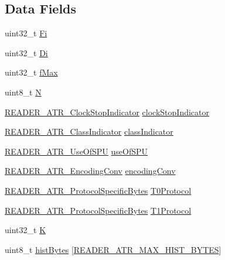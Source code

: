 \subsection*{Data Fields}
\begin{DoxyCompactItemize}
\item 
uint32\+\_\+t \hyperlink{struct_r_e_a_d_e_r___a_t_r___atr_a4b9462052eea4404479658f230fa1c44}{Fi}
\item 
uint32\+\_\+t \hyperlink{struct_r_e_a_d_e_r___a_t_r___atr_aaf651c30f03f8f1e13a9485bffce801e}{Di}
\item 
uint32\+\_\+t \hyperlink{struct_r_e_a_d_e_r___a_t_r___atr_aad51bc4d2b761f55851ccd39a180ba58}{f\+Max}
\item 
uint8\+\_\+t \hyperlink{struct_r_e_a_d_e_r___a_t_r___atr_a77200420e0e4a3db85d736b7a0b91f64}{N}
\item 
\hyperlink{reader__atr_8h_a88b93dcccf6f332cf9a8a08100706e7f}{R\+E\+A\+D\+E\+R\+\_\+\+A\+T\+R\+\_\+\+Clock\+Stop\+Indicator} \hyperlink{struct_r_e_a_d_e_r___a_t_r___atr_a6ff1a13065a4f65bf3d92b693f828547}{clock\+Stop\+Indicator}
\item 
\hyperlink{reader__atr_8h_a59d38a6964b5cbc4d02b4569618e648b}{R\+E\+A\+D\+E\+R\+\_\+\+A\+T\+R\+\_\+\+Class\+Indicator} \hyperlink{struct_r_e_a_d_e_r___a_t_r___atr_a1aff6df1a1c438920c34249aa797896a}{class\+Indicator}
\item 
\hyperlink{reader__atr_8h_abefacd0599f2700370b31a1fae95caaf}{R\+E\+A\+D\+E\+R\+\_\+\+A\+T\+R\+\_\+\+Use\+Of\+S\+PU} \hyperlink{struct_r_e_a_d_e_r___a_t_r___atr_a7d23fda1eb2b5cd25709f6152299f944}{use\+Of\+S\+PU}
\item 
\hyperlink{reader__atr_8h_a193a4a51751968ed8d31224726c2b967}{R\+E\+A\+D\+E\+R\+\_\+\+A\+T\+R\+\_\+\+Encoding\+Conv} \hyperlink{struct_r_e_a_d_e_r___a_t_r___atr_a8b520c86d8fd45cf1ab80a917b22f8ba}{encoding\+Conv}
\item 
\hyperlink{struct_r_e_a_d_e_r___a_t_r___protocol_specific_bytes}{R\+E\+A\+D\+E\+R\+\_\+\+A\+T\+R\+\_\+\+Protocol\+Specific\+Bytes} \hyperlink{struct_r_e_a_d_e_r___a_t_r___atr_a701db7ee03dbfdfda068a8d01e3c5439}{T0\+Protocol}
\item 
\hyperlink{struct_r_e_a_d_e_r___a_t_r___protocol_specific_bytes}{R\+E\+A\+D\+E\+R\+\_\+\+A\+T\+R\+\_\+\+Protocol\+Specific\+Bytes} \hyperlink{struct_r_e_a_d_e_r___a_t_r___atr_a85a0512d06623db91c50d80ebee541f4}{T1\+Protocol}
\item 
uint32\+\_\+t \hyperlink{struct_r_e_a_d_e_r___a_t_r___atr_a847561bce07d061a0b82d34baf7d20d2}{K}
\item 
uint8\+\_\+t \hyperlink{struct_r_e_a_d_e_r___a_t_r___atr_a728edc393bb3b7e3853c5a5aaf019683}{hist\+Bytes} \mbox{[}\hyperlink{reader__atr_8h_a109a98f6497fb49ae8a3d26693628fa7}{R\+E\+A\+D\+E\+R\+\_\+\+A\+T\+R\+\_\+\+M\+A\+X\+\_\+\+H\+I\+S\+T\+\_\+\+B\+Y\+T\+ES}\mbox{]}
\end{DoxyCompactItemize}


